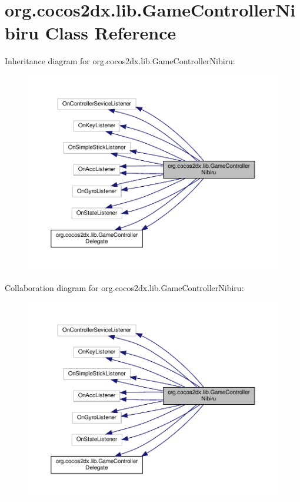 \hypertarget{classorg_1_1cocos2dx_1_1lib_1_1GameControllerNibiru}{}\section{org.\+cocos2dx.\+lib.\+Game\+Controller\+Nibiru Class Reference}
\label{classorg_1_1cocos2dx_1_1lib_1_1GameControllerNibiru}


Inheritance diagram for org.\+cocos2dx.\+lib.\+Game\+Controller\+Nibiru\+:
\nopagebreak
\begin{figure}[H]
\begin{center}
\leavevmode
\includegraphics[width=350pt]{classorg_1_1cocos2dx_1_1lib_1_1GameControllerNibiru__inherit__graph}
\end{center}
\end{figure}


Collaboration diagram for org.\+cocos2dx.\+lib.\+Game\+Controller\+Nibiru\+:
\nopagebreak
\begin{figure}[H]
\begin{center}
\leavevmode
\includegraphics[width=350pt]{classorg_1_1cocos2dx_1_1lib_1_1GameControllerNibiru__coll__graph}
\end{center}
\end{figure}
